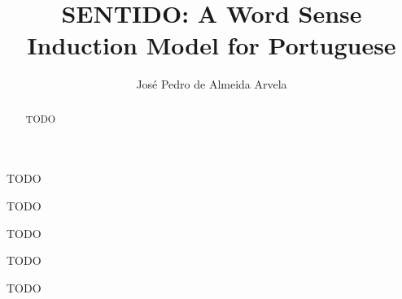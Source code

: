 \documentclass[a4paper,10pt,twoside,onecolumn,final,openright,leqno]{book}
\title{SENTIDO: A Word Sense Induction Model for Portuguese}
\author{José Pedro de Almeida Arvela}
\begin{document}
\maketitle

\begin{acknowledgements}
 TODO
\end{acknowledgements}

\begin{dedications}
 TODO
\end{dedications}

\begin{resumo}
 TODO
\end{resumo}

\begin{abstract}
 TODO
\end{abstract}

\begin{keywords}
 TODO

 TODO
\end{keywords}


\tableofcontents

\listoffigures
\newpage

\listoftables
\newpage

\begin{aclist}
\end{aclist}

\startdocument




\end{document}
